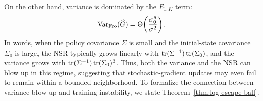 On the other hand, variance is dominated by the $E_{1,K}$ term:
$$
\VarF(\widehat G) = \Theta\!\left(\frac{\sigma_0^{6}}{\sigma^{2}}\right).
\vspace{-2mm}
$$
In words, when the policy covariance $\Sigma$ is small and the initial-state covariance $\Sigma_0$ is large, the NSR typically grows linearly with
\(\operatorname{tr}(\Sigma^{-1})\operatorname{tr}(\Sigma_0)\), and the variance grows with
\(\operatorname{tr}(\Sigma^{-1})\operatorname{tr}(\Sigma_0)^3\). Thus, both the variance and the NSR can blow up in this regime, suggesting that stochastic-gradient updates may even fail to remain within a bounded neighborhood. To formalize the connection between variance blow-up and training instability, we state Theorem~\ref{thm:lqg-escape-ball}.

